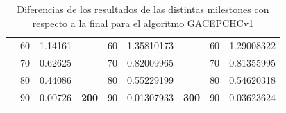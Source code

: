 \begin{table}[]
\begin{tabular}{|ccrccrccr|}
\rowcolor[HTML]{DDFDFF} 
\multicolumn{1}{|c|}{\cellcolor[HTML]{FFFFC7}}                                & \multicolumn{1}{c|}{\cellcolor[HTML]{DDFDFF}60}        & \multicolumn{1}{r|}{\cellcolor[HTML]{DDFDFF}1.14161}    & \multicolumn{1}{c|}{\cellcolor[HTML]{FFFFC7}}                                & \multicolumn{1}{c|}{\cellcolor[HTML]{DDFDFF}60}        & \multicolumn{1}{r|}{\cellcolor[HTML]{DDFDFF}1.35810173} & \multicolumn{1}{c|}{\cellcolor[HTML]{FFFFC7}}                                & \multicolumn{1}{c|}{\cellcolor[HTML]{DDFDFF}60}        & 1.29008322                                              \\ \cline{2-3} \cline{5-6} \cline{8-9} 
\rowcolor[HTML]{DAE8FC} 
\multicolumn{1}{|c|}{\cellcolor[HTML]{FFFFC7}}                                & \multicolumn{1}{c|}{\cellcolor[HTML]{DAE8FC}70}        & \multicolumn{1}{r|}{\cellcolor[HTML]{DAE8FC}0.62625}    & \multicolumn{1}{c|}{\cellcolor[HTML]{FFFFC7}}                                & \multicolumn{1}{c|}{\cellcolor[HTML]{DAE8FC}70}        & \multicolumn{1}{r|}{\cellcolor[HTML]{DAE8FC}0.82009965} & \multicolumn{1}{c|}{\cellcolor[HTML]{FFFFC7}}                                & \multicolumn{1}{c|}{\cellcolor[HTML]{DAE8FC}70}        & 0.81355995                                              \\ \cline{2-3} \cline{5-6} \cline{8-9} 
\rowcolor[HTML]{DDFDFF} 
\multicolumn{1}{|c|}{\cellcolor[HTML]{FFFFC7}}                                & \multicolumn{1}{c|}{\cellcolor[HTML]{DDFDFF}80}        & \multicolumn{1}{r|}{\cellcolor[HTML]{DDFDFF}0.44086}    & \multicolumn{1}{c|}{\cellcolor[HTML]{FFFFC7}}                                & \multicolumn{1}{c|}{\cellcolor[HTML]{DDFDFF}80}        & \multicolumn{1}{r|}{\cellcolor[HTML]{DDFDFF}0.55229199} & \multicolumn{1}{c|}{\cellcolor[HTML]{FFFFC7}}                                & \multicolumn{1}{c|}{\cellcolor[HTML]{DDFDFF}80}        & 0.54620318                                              \\ \cline{2-3} \cline{5-6} \cline{8-9} 
\rowcolor[HTML]{DAE8FC} 
\multicolumn{1}{|c|}{\multirow{-13}{*}{\cellcolor[HTML]{FFFFC7}\textbf{100}}} & \multicolumn{1}{c|}{\cellcolor[HTML]{DAE8FC}90}        & \multicolumn{1}{r|}{\cellcolor[HTML]{DAE8FC}0.00726}    & \multicolumn{1}{c|}{\multirow{-13}{*}{\cellcolor[HTML]{FFFFC7}\textbf{200}}} & \multicolumn{1}{c|}{\cellcolor[HTML]{DAE8FC}90}        & \multicolumn{1}{r|}{\cellcolor[HTML]{DAE8FC}0.01307933} & \multicolumn{1}{c|}{\multirow{-13}{*}{\cellcolor[HTML]{FFFFC7}\textbf{300}}} & \multicolumn{1}{c|}{\cellcolor[HTML]{DAE8FC}90}        & 0.03623624                                              \\ \hline
\end{tabular}
\caption{\label{DiferenciasGACEPCHCv1}Diferencias de los resultados de las distintas milestones con respecto a la final para el algoritmo GACEPCHCv1}
\end{table}

